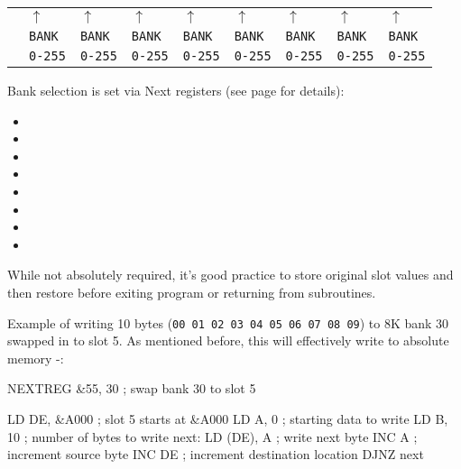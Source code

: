 \vspace*{-0.7em}

\begin{tabular}{p{1.8cm}C{1.1cm}C{1.1cm}C{1.1cm}C{1.1cm}C{1.1cm}C{1.1cm}C{1.1cm}C{1.1cm}}
			& $\uparrow$		& $\uparrow$		& $\uparrow$		& $\uparrow$		& $\uparrow$		& $\uparrow$		& $\uparrow$		& $\uparrow$ \\
			& {\tt BANK}		& {\tt BANK}		& {\tt BANK}		& {\tt BANK}		& {\tt BANK}		& {\tt BANK}		& {\tt BANK}		& {\tt BANK} \\
			& {\tt 0-255}		& {\tt 0-255}		& {\tt 0-255}		& {\tt 0-255}		& {\tt 0-255}		& {\tt 0-255}		& {\tt 0-255}		& {\tt 0-255} \\
\end{tabular}

Bank selection is set via Next registers (see page  for details):

\begin{itemize}[topsep=0pt,itemsep=0pt]
	\item {}
	\item {}
	\item {}
	\item {}
	\item {}
	\item {}
	\item {}
	\item {}
\end{itemize}

While not absolutely required, it's good practice to store original slot values and then restore before exiting program or returning from subroutines.

Example of writing 10 bytes ({\tt 00 01 02 03 04 05 06 07 08 09}) to 8K bank 30 swapped in to slot 5. As mentioned before, this will effectively write to absolute memory -:

\begin{tcblisting}{}
    NEXTREG &55, 30     ; swap bank 30 to slot 5

    LD DE, &A000        ; slot 5 starts at &A000
    LD A, 0             ; starting data to write
    LD B, 10            ; number of bytes to write
next:
    LD (DE), A          ; write next byte
    INC A               ; increment source byte
    INC DE              ; increment destination location
    DJNZ next
\end{tcblisting}

